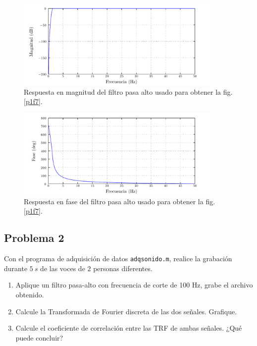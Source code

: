 \documentclass[a4paper,12pt,final]{article}
\begin{document}
    \begin{figure}[H]
      \begin{center}
        \caption{Respuesta en magnitud del filtro pasa alto usado para obtener la fig. \ref{p1f7}.}
        \label{p1f9}
        \vspace{-1em}
        \includegraphics[width=0.9\textwidth]{./laboratorio_5/problema01_highpass_filter_magnitude.pdf}
      \end{center}
    \end{figure}

    \begin{figure}[H]
      \begin{center}
        \caption{Respuesta en fase del filtro pasa alto usado para obtener la fig. \ref{p1f7}.}
        \label{p1f10}
        \vspace{-1em}
        \includegraphics[width=0.9\textwidth]{./laboratorio_5/problema01_highpass_filter_phase.pdf}
      \end{center}
    \end{figure}

  \newpage
  \subsection*{Problema 2}
    \noindent Con el programa de adquisición de datos \texttt{adqsonido.m}, realice
      la grabación durante $5\ s$ de las voces de $2$ personas diferentes.

      \begin{enumerate}[label=\alph*)]
        \item Aplique un filtro pasa-alto con frecuencia de corte de 100 Hz,
              grabe el archivo obtenido.
        \item Calcule la Transformada de Fourier discreta de las dos señales.
              Grafique.
        \item Calcule el coeficiente de correlación entre las TRF de ambas
              señales. ¿Qué puede concluir?
      \end{enumerate}
\end{document}
